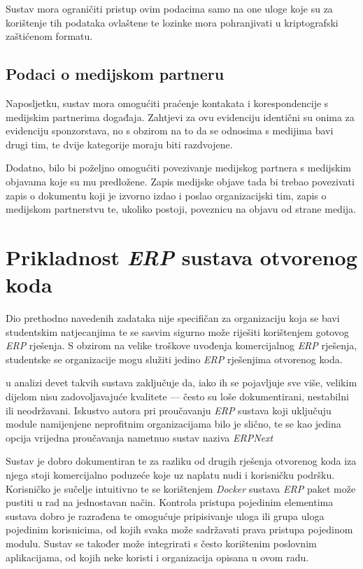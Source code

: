 \documentclass[times, utf8, diplomski]{fer}
\begin{document}
Sustav mora ograničiti pristup ovim podacima samo na one uloge koje su za
korištenje tih podataka ovlaštene te lozinke mora pohranjivati u kriptografski
zaštićenom formatu.

\section{Podaci o medijskom partneru}

Naposljetku, sustav mora omogućiti praćenje kontakata i korespondencije s
medijskim partnerima događaja. Zahtjevi za ovu evidenciju identični su onima za
evidenciju sponzorstava, no s obzirom na to da se odnosima s medijima bavi drugi
tim, te dvije kategorije moraju biti razdvojene.

Dodatno, bilo bi poželjno omogućiti povezivanje medijskog partnera s medijskim
objavama koje su mu predložene. Zapis medijske objave tada bi trebao povezivati
zapis o dokumentu koji je izvorno izdao i poslao organizacijski tim, zapis o
medijskom partnerstvu te, ukoliko postoji, poveznicu na objavu od strane medija.

\chapter{Prikladnost \emph{ERP} sustava otvorenog koda}

Dio prethodno navedenih zadataka nije specifičan za organizaciju koja se bavi
studentskim natjecanjima te se sasvim sigurno može riješiti korištenjem gotovog
\emph{ERP} rješenja. S obzirom na velike troškove uvođenja komercijalnog
\emph{ERP} rješenja, studentske se organizacije mogu služiti jedino \emph{ERP}
rješenjima otvorenog koda.

\cite{erpstudy} u analizi devet takvih sustava zaključuje da, iako ih se
pojavljuje sve više, velikim dijelom nisu zadovoljavajuće kvalitete --- često su
loše dokumentirani, nestabilni ili neodržavani. Iskustvo autora pri proučavanju
\emph{ERP} sustava koji uključuju module namijenjene neprofitnim organizacijama
bilo je slično, te se kao jedina opcija vrijedna proučavanja nametnuo sustav
naziva \emph{ERPNext}

Sustav je dobro dokumentiran te za razliku od drugih rješenja otvorenog koda iza
njega stoji komercijalno poduzeće koje uz naplatu nudi i korisničku podršku.
Korisničko je sučelje intuitivno te se korištenjem \emph{Docker} sustava
\emph{ERP} paket može pustiti u rad na jednostavan način. Kontrola pristupa
pojedinim elementima sustava dobro je razrađena te omogućuje pripisivanje uloga
ili grupa uloga pojedinim korisnicima, od kojih svaka može sadržavati prava
pristupa pojedinom modulu. Sustav se također može integrirati s često korištenim
poslovnim aplikacijama, od kojih neke koristi i organizacija opisana u ovom
radu.
\end{document}
